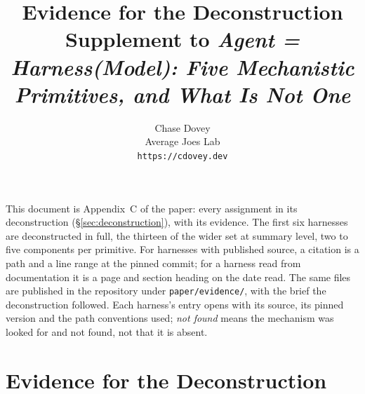 \documentclass[11pt]{article}
\title{Evidence for the Deconstruction\\[4pt]\large Supplement to \emph{Agent = Harness(Model): Five Mechanistic Primitives, and What Is Not One}}
\author{Chase Dovey\\Average Joes Lab\\\texttt{https://cdovey.dev}}
\date{}
\begin{document}
\maketitle
\noindent This document is Appendix~C of the paper: every assignment in its deconstruction (\S\ref{sec:deconstruction}), with its evidence. The first six harnesses are deconstructed in full, the thirteen of the wider set at summary level, two to five components per primitive. For harnesses with published source, a citation is a path and a line range at the pinned commit; for a harness read from documentation it is a page and section heading on the date read. The same files are published in the repository under \texttt{paper/evidence/}, with the brief the deconstruction followed. Each harness's entry opens with its source, its pinned version and the path conventions used; \emph{not found} means the mechanism was looked for and not found, not that it is absent.

\appendix
\setcounter{section}{2}
\section{Evidence for the Deconstruction}
\begingroup\footnotesize\sloppy

\endgroup
\end{document}
